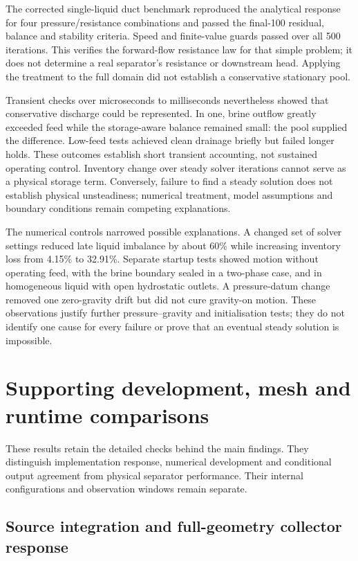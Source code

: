 The corrected single-liquid duct benchmark reproduced the analytical response for four pressure/resistance combinations and passed the final-100 residual, balance and stability criteria. Speed and finite-value guards passed over all 500 iterations. This verifies the forward-flow resistance law for that simple problem; it does not determine a real separator's resistance or downstream head. Applying the treatment to the full domain did not establish a conservative stationary pool.

Transient checks over microseconds to milliseconds nevertheless showed that conservative discharge could be represented. In one, brine outflow greatly exceeded feed while the storage-aware balance remained small: the pool supplied the difference. Low-feed tests achieved clean drainage briefly but failed longer holds. These outcomes establish short transient accounting, not sustained operating control. Inventory change over steady solver iterations cannot serve as a physical storage term. Conversely, failure to find a steady solution does not establish physical unsteadiness; numerical treatment, model assumptions and boundary conditions remain competing explanations.

The numerical controls narrowed possible explanations. A changed set of solver settings reduced late liquid imbalance by about 60\% while increasing inventory loss from 4.15\% to 32.91\%. Separate startup tests showed motion without operating feed, with the brine boundary sealed in a two-phase case, and in homogeneous liquid with open hydrostatic outlets. A pressure-datum change removed one zero-gravity drift but did not cure gravity-on motion. These observations justify further pressure--gravity and initialisation tests; they do not identify one cause for every failure or prove that an eventual steady solution is impossible.

\section{Supporting development, mesh and runtime comparisons}

These results retain the detailed checks behind the main findings. They distinguish implementation response, numerical development and conditional output agreement from physical separator performance. Their internal configurations and observation windows remain separate.

\subsection{Source integration and full-geometry collector response}

